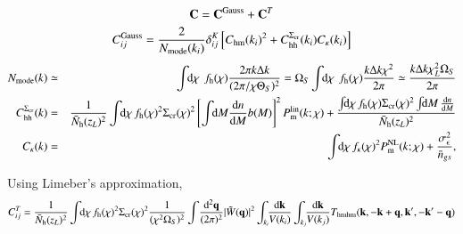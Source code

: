 \documentclass[onecolumn,notitlepage,showpacs,amsmath,amssymb,prd,floatfix]{revtex4-1}
\newcommand{\bk}{{\bf k}}
\newcommand{\bq}{{\bf q}}
\newcommand{\tW}{\tilde{W}}
\newcommand{\dr}{\mathrm{d}}
\newcommand{\chm}{C_{\mathrm{hm}}}
\newcommand{\chh}{C_{\mathrm{hh}}}
\newcommand{\bh}{\mathrm{h}}
\newcommand{\bnh}{\frac{\dr n}{\dr M}}
\newcommand{\pml}{P^{\rm lin}_{\rm m}}
\newcommand{\sigmacr}{\Sigma_{\rm cr}}
\newcommand{\bNh}{\bar{N}_{\rm h}}
\begin{document}
%
\begin{equation}
 {\bf C}={\bf C}^{\rm Gauss}+{\bf C}^{T}
\end{equation}
%
\begin{equation}
 C^{\rm Gauss}_{ij}=\frac{2}{N_{\rm mode}(k_i)}\delta^K_{ij}
  \left[\chm(k_i)^2+C_{\rm hh}^{\sigmacr}(k_i)C_\kappa(k_i)\right]
\end{equation}
%
\begin{eqnarray}
N_{\rm mode}(k)&\simeq &\int\!\!\dr\chi~\, f_\bh(\chi)\frac{2\pi k\Delta
 k}{(2\pi/\chi\Theta_S)^2}=\Omega_S
 \int\!\!\dr\chi~\, f_\bh(\chi)\frac{ k\Delta k\chi^2}{2\pi}\simeq
 \frac{k\Delta k\chi_L^2\Omega_S}{2\pi}\nonumber\\
 \chh^{\sigmacr}(k)&=&\frac{1}{\bNh(z_L)^2}
  \int\!\!\dr\chi\, f_\bh(\chi)^2\sigmacr(\chi)^2\left[\int\!\!\dr
					    M\bnh b(M)\right]^2\pml(k;\chi)+
  \frac{\int\!\!\dr\chi\, f_\bh(\chi)\sigmacr(\chi)^2\int\!\!\dr M\,
  \bnh}{\bNh(z_L)^2}\nonumber\\
C_\kappa(k)&=&\int\!\!\dr\chi\,f_\kappa(\chi)^2P^{\rm NL}_{\rm
 m}(k;\chi)+\frac{\sigma_\epsilon^2}{\bar{n}_{gs}},
\end{eqnarray}
%

Using Limeber's approximation,
%
\begin{equation}
C^T_{ij}=\frac{1}{\bNh(z_L)^2}\int\!\!\dr\chi\,
 f_\bh(\chi)^2\sigmacr(\chi)^2
 \frac{1}{(\chi^2\Omega_S)^2}\int\!\frac{\dr^2\bq}{(2\pi)^2}|\tW(\bq)|^2
 \int_{k_i}\!\!\frac{\dr\bk}{V(k_i)}
 \int_{k_j}\!\!\frac{\dr\bk}{V(k_j)}
 T_{\rm hmhm}(\bk,-\bk+\bq,\bk',-\bk'-\bq)
\end{equation}
\end{document}
